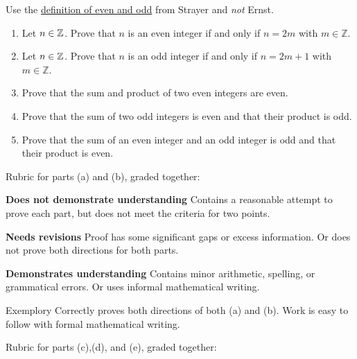 \documentclass[letterpaper, 11 pt]{../ximera}
\begin{document}
\begin{problem}\label{-even-odd}%
Use the \hyperref[def-even-odd-divides]{definition of even and odd} from Strayer and \emph{not} Ernst.%
    \begin{enumerate}[label=(\alph*)]
        \item\label{even-equiv-def} Let \(n\in\mathbb Z\). Prove that \(n\) is an even integer if and only if \(n=2m\) with \(m\in\mathbb{Z}\).%
        \item\label{odd-equiv-def} Let \(n\in\mathbb Z\). Prove that \(n\) is an odd integer if and only if \(n=2m+1\) with \(m\in\mathbb{Z}\).%
        \item\label{sum-prod-even} Prove that the sum and product of two even integers are even.%
        \item\label{sum-prod-odd} Prove that the sum of two odd integers is even and that their product is odd.%
        \item\label{sum-prod-even-odd} Prove that the sum of an even integer and an odd integer is odd and that their product is even.%
    \end{enumerate}
%

    Rubric for parts (a) and (b), graded together:%
        
    \begin{writeRubric}
        \item \textbf{Does not demonstrate understanding}
        Contains a reasonable attempt to prove each part, but does not meet the criteria for two points.
        \item \textbf{Needs revisions}
        Proof has some significant gaps or excess information. Or does not prove both directions for both parts.
        \item \textbf{Demonstrates understanding}
        Contains minor arithmetic, spelling, or grammatical errors. Or uses informal mathematical writing.
        \item [Exemplory]
        Correctly proves both directions of both (a) and (b). Work is easy to follow with formal mathematical writing.
    \end{writeRubric}
%

    Rubric for parts (c),(d), and (e), graded together:%
        

\end{problem}
\end{document}
